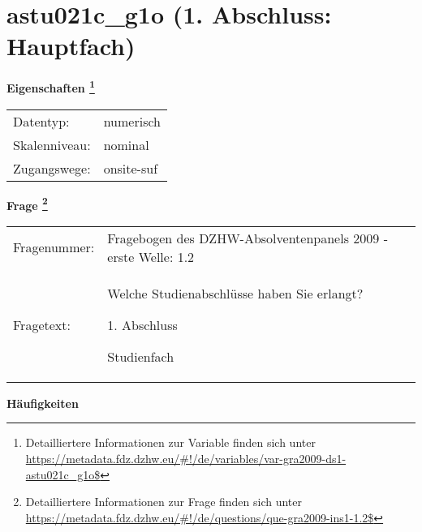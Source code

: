 
    \setcounter{footnote}{0}

    \vspace*{-1.8cm}
	\section{astu021c\_g1o (1. Abschluss: Hauptfach)}
	\label{section:astu021c_g1o}



    \vspace*{0.5cm}
    \noindent\textbf{Eigenschaften
	\footnote{Detailliertere Informationen zur Variable finden sich unter
		\url{https://metadata.fdz.dzhw.eu/\#!/de/variables/var-gra2009-ds1-astu021c_g1o$}}}\\
	\begin{tabularx}{\hsize}{@{}lX}
	Datentyp: & numerisch \\
	Skalenniveau: & nominal \\
	Zugangswege: &
	  onsite-suf
 \\
    \end{tabularx}



				\vspace*{0.5cm}
                \noindent\textbf{Frage
	                \footnote{Detailliertere Informationen zur Frage finden sich unter
		              \url{https://metadata.fdz.dzhw.eu/\#!/de/questions/que-gra2009-ins1-1.2$}}}\\
				\begin{tabularx}{\hsize}{@{}lX}
					Fragenummer: &
					  Fragebogen des DZHW-Absolventenpanels 2009 - erste Welle:
					  1.2
 \\
					Fragetext: & Welche Studienabschlüsse haben Sie erlangt?\par  1. Abschluss\par  Studienfach \\
				\end{tabularx}





        		\vspace*{0.5cm}
                \noindent\textbf{Häufigkeiten}

